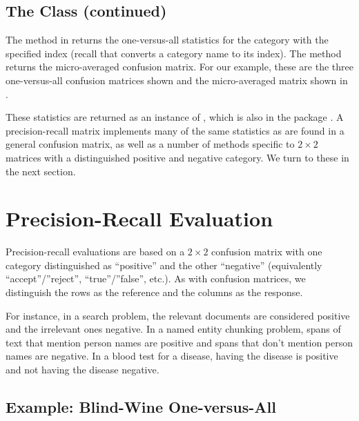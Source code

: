 \subsection{The  Class (continued)}\label{section:classifier-eval-one-v-all}

The method  in  returns the
one-versus-all statistics for the category with the specified index
(recall that  converts a category name to its
index).  The method  returns the micro-averaged
confusion matrix.  For our example, these are the three one-versus-all
confusion matrices shown  and the
micro-averaged matrix shown in . 


These statistics are returned as an instance of
, which is also in the package
.  A precision-recall matrix implements many
of the same statistics as are found in a general confusion matrix, as
well as a number of methods specific to $2 \times 2$ matrices with a
distinguished positive and negative category.  We turn to these in the
next section.
  

\section{Precision-Recall Evaluation}

Precision-recall evaluations are based on a $2 \times 2$ confusion
matrix with one category distinguished as ``positive'' and the other
``negative'' (equivalently ``accept''/''reject'', ``true''/''false'',
etc.).  As with confusion matrices, we distinguish the rows as the
reference and the columns as the response.  

For instance, in a search problem, the relevant documents are
considered positive and the irrelevant ones negative.  In a named
entity chunking problem, spans of text that mention person names are
positive and spans that don't mention person names are negative.  In a
blood test for a disease, having the disease is positive and not
having the disease negative.

\subsection{Example:  Blind-Wine One-versus-All}

